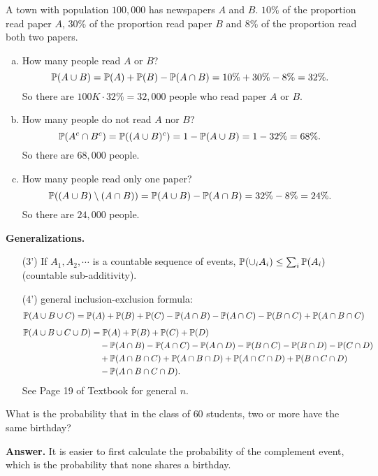   \begin{example}
    A town with population $100,000$ has newspapers $A$ and $B$. $10\%$ of the
    proportion read paper $A$, $30\%$ of the
    proportion read paper $B$ and $8\%$ of the
    proportion read both two papers. 
  \end{example}
  \begin{enumerate}[(a)]
  \item How many people read $A$ or $B$?
    \[
      \mathbb{P}(A\cup B) = \mathbb{P}(A) + \mathbb{P}(B) - \mathbb{P}(A\cap B) = 10\% + 30\% - 8\% = 32\%.
    \]
    So there are $100 K\cdot 32\% = 32,000$ people who read paper $A$ or $B$.
  \item How many people do not read $A$ nor $B$?
    \[
      \mathbb{P}(A^c\cap B^c) = \mathbb{P}((A\cup B)^c) = 1 - \mathbb{P}(A\cup B) = 1-32\% = 68\%.
    \]
    So there are $68,000$ people.
  \item How many people read only one paper?
    \[
      \mathbb{P}((A\cup B)\setminus (A\cap B)) = \mathbb{P}(A\cup B) - \mathbb{P}(A\cap B) = 32\% -8\% = 24\%.
    \]
    So there are $24,000$ people.
  \end{enumerate}
  \textbf{Generalizations.}
  \begin{itemize}
  \item [(3')] If $A_1,A_2,\cdots$ is a countable sequence of events,
    $\mathbb{P}(\cup_i A_i) \le \sum_i \mathbb{P}(A_i)$ (countable sub-additivity).
  \item [(4')] general inclusion-exclusion formula:
    \begin{align*}
      \mathbb{P}(A\cup B\cup C)
      & = \mathbb{P}(A) + \mathbb{P}(B) + \mathbb{P}(C) - \mathbb{P}(A\cap B) - \mathbb{P}(A\cap C) -\mathbb{P}(B\cap C) + \mathbb{P}(A\cap B\cap C)
    \end{align*}
    \begin{align*}
      \mathbb{P}(A\cup B\cup C\cup D)
      & = \mathbb{P}(A) + \mathbb{P}(B) + \mathbb{P}(C) + \mathbb{P}(D)\\
      & \quad - \mathbb{P}(A\cap B) - \mathbb{P}(A\cap C) - \mathbb{P}(A\cap D) - \mathbb{P}(B\cap C) -\mathbb{P}(B\cap D) - \mathbb{P}(C\cap D)\\
      & \quad + \mathbb{P}(A\cap B\cap C) + \mathbb{P}(A\cap B\cap D) + \mathbb{P}(A\cap C\cap D) + \mathbb{P}(B\cap C\cap D)\\
      & \quad - \mathbb{P}(A\cap B\cap C\cap D).
    \end{align*}
    See Page 19 of Textbook for general $n$.
  \end{itemize}
  \begin{example}
    What is the probability that in the class of $60$ students, two or more have
    the same birthday?
  \end{example}
  \textbf{Answer.} It is easier to first calculate the probability of the
  complement event, which is the probability that none shares a birthday.

